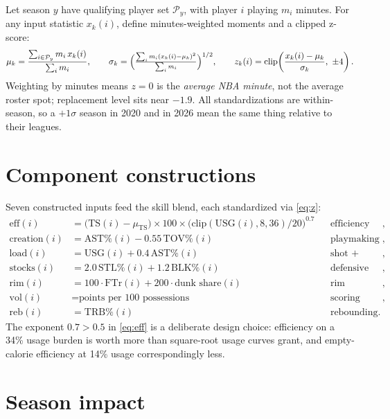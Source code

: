 \documentclass[11pt]{article}
\begin{document}
Let season $y$ have qualifying player set $\mathcal{P}_y$, with player $i$ playing $m_i$
minutes. For any input statistic $x_k(i)$, define minutes-weighted moments and a clipped
z-score:
\begin{equation}
\mu_k = \frac{\sum_{i \in \mathcal{P}_y} m_i\, x_k(i)}{\sum_i m_i},
\qquad
\sigma_k = \Bigl(\tfrac{\sum_i m_i (x_k(i) - \mu_k)^2}{\sum_i m_i}\Bigr)^{1/2},
\qquad
z_k(i) = \mathrm{clip}\!\left(\frac{x_k(i) - \mu_k}{\sigma_k},\ \pm 4\right).
\label{eq:z}
\end{equation}
Weighting by minutes means $z = 0$ is the \emph{average NBA minute}, not the average
roster spot; replacement level sits near $-1.9$. All standardizations are within-season,
so a $+1\sigma$ season in 2020 and in 2026 mean the same thing relative to their leagues.

\section{Component constructions}

Seven constructed inputs feed the skill blend, each standardized via \eqref{eq:z}:
\begin{align}
\text{eff}(i) &= \bigl(\mathrm{TS}(i) - \mu_{\mathrm{TS}}\bigr) \times 100 \times
\bigl(\mathrm{clip}(\mathrm{USG}(i), 8, 36)/20\bigr)^{0.7}
&&\text{efficiency under load},
\label{eq:eff}\\
\text{creation}(i) &= \mathrm{AST\%}(i) - 0.55\,\mathrm{TOV\%}(i)
&&\text{playmaking net of waste},\\
\text{load}(i) &= \mathrm{USG}(i) + 0.4\,\mathrm{AST\%}(i)
&&\text{shot + playmaking burden},\\
\text{stocks}(i) &= 2.0\,\mathrm{STL\%}(i) + 1.2\,\mathrm{BLK\%}(i)
&&\text{defensive events},\\
\text{rim}(i) &= 100\cdot\mathrm{FTr}(i) + 200\cdot\text{dunk share}(i)
&&\text{rim pressure},\\
\text{vol}(i) &= \text{points per 100 possessions}
&&\text{scoring volume},\\
\text{reb}(i) &= \mathrm{TRB\%}(i)
&&\text{rebounding}.
\end{align}
The exponent $0.7 > 0.5$ in \eqref{eq:eff} is a deliberate design choice: efficiency on a
34\% usage burden is worth more than square-root usage curves grant, and empty-calorie
efficiency at 14\% usage correspondingly less.

\section{Season impact}
\end{document}
